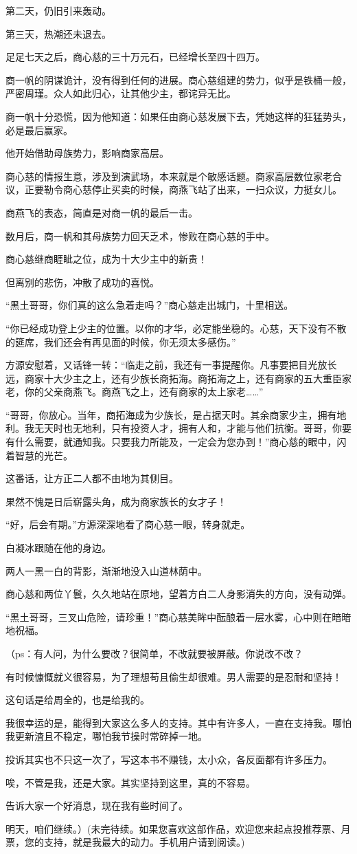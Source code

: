 \begin{this_body}
第二天，仍旧引来轰动。

第三天，热潮还未退去。

足足七天之后，商心慈的三十万元石，已经增长至四十四万。

商一帆的阴谋诡计，没有得到任何的进展。商心慈组建的势力，似乎是铁桶一般，严密周瑾。众人如此归心，让其他少主，都诧异无比。

商一帆十分恐慌，因为他知道：如果任由商心慈发展下去，凭她这样的狂猛势头，必是最后赢家。

他开始借助母族势力，影响商家高层。

商心慈的情报生意，涉及到演武场，本来就是个敏感话题。商家高层数位家老合议，正要勒令商心慈停止买卖的时候，商燕飞站了出来，一扫众议，力挺女儿。

商燕飞的表态，简直是对商一帆的最后一击。

数月后，商一帆和其母族势力回天乏术，惨败在商心慈的手中。

商心慈继商睚眦之位，成为十大少主中的新贵！

但离别的悲伤，冲散了成功的喜悦。

“黑土哥哥，你们真的这么急着走吗？”商心慈走出城门，十里相送。

“你已经成功登上少主的位置。以你的才华，必定能坐稳的。心慈，天下没有不散的筵席，我们还会有再见面的时候，你无须太多感伤。”

方源安慰着，又话锋一转：“临走之前，我还有一事提醒你。凡事要把目光放长远，商家十大少主之上，还有少族长商拓海。商拓海之上，还有商家的五大重臣家老，你的父亲商燕飞。商燕飞之上，还有商家的太上家老……”

“哥哥，你放心。当年，商拓海成为少族长，是占据天时。其余商家少主，拥有地利。我无天时也无地利，只有投资人才，拥有人和，才能与他们抗衡。哥哥，你要有什么需要，就通知我。只要我力所能及，一定会为您办到！”商心慈的眼中，闪着智慧的光芒。

这番话，让方正二人都不由地为其侧目。

果然不愧是日后崭露头角，成为商家族长的女才子！

“好，后会有期。”方源深深地看了商心慈一眼，转身就走。

白凝冰跟随在他的身边。

两人一黑一白的背影，渐渐地没入山道林荫中。

商心慈和两位丫鬟，久久地站在原地，望着方白二人身影消失的方向，没有动弹。

“黑土哥哥，三叉山危险，请珍重！”商心慈美眸中酝酿着一层水雾，心中则在暗暗地祝福。

（ps：有人问，为什么要改？很简单，不改就要被屏蔽。你说改不改？

有时候慷慨就义很容易，为了理想苟且偷生却很难。男人需要的是忍耐和坚持！

这句话是给周全的，也是给我的。

我很幸运的是，能得到大家这么多人的支持。其中有许多人，一直在支持我。哪怕我更新渣且不稳定，哪怕我节操时常碎掉一地。

投诉其实也不只这一次了，写这本书不赚钱，太小众，各反面都有许多压力。

唉，不管是我，还是大家。其实坚持到这里，真的不容易。

告诉大家一个好消息，现在我有些时间了。

明天，咱们继续。）(未完待续。如果您喜欢这部作品，欢迎您来起点投推荐票、月票，您的支持，就是我最大的动力。手机用户请到阅读。)

\end{this_body}

